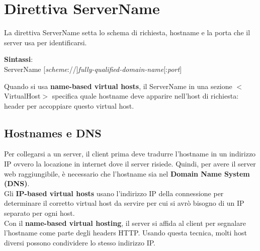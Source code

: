 \section{Direttiva ServerName}
La direttiva ServerName setta lo schema di richiesta, hostname e la porta che il server usa per identificarsi.
\begin{center}
    \textbf{Sintassi}: \\
ServerName [\emph{scheme}://]\emph{fully-qualified-domain-name}[:\emph{port}]
\end{center}
Quando si usa \textbf{name-based virtual hosts}, il ServerName in una sezione $<$VirtualHost$>$ specifica quale hostname deve apparire nell'host di richiesta: header per accoppiare questo virtual host.


\subsection{Hostnames e DNS}
Per collegarsi a un server, il client prima deve tradurre l'hostname in un indirizzo IP ovvero la locazione in internet dove il server risiede. Quindi, per avere il server web raggiungibile, è necessario che l'hostname sia nel \textbf{Domain Name System (DNS)}. \\
Gli \textbf{IP-based virtual hosts} usano l'indirizzo IP della connessione per determinare il corretto virtual host da servire per cui si avrò bisogno di un IP separato per ogni host.\\
Con il \textbf{name-based virtual hosting}, il server si affida al client per segnalare l'hostname come parte degli headers HTTP. Usando questa tecnica, molti host diversi possono condividere lo stesso indirizzo IP. 

